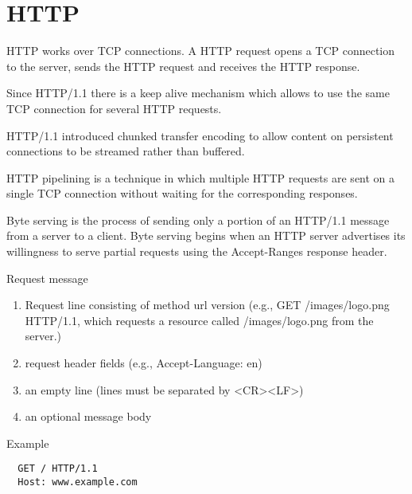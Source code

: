 \section{HTTP}

HTTP works over TCP connections. A HTTP request opens a TCP connection to the
server, sends the HTTP request and receives the HTTP response.

Since HTTP/1.1 there is a keep alive mechanism which allows to use the same
TCP connection for several HTTP requests.

HTTP/1.1 introduced chunked transfer encoding to allow content on persistent
connections to be streamed rather than buffered.

HTTP pipelining is a technique in which multiple HTTP requests are sent on a
single TCP connection without waiting for the corresponding responses.

Byte serving is the process of sending only a portion of an HTTP/1.1 message
from a server to a client. Byte serving begins when an HTTP server advertises
its willingness to serve partial requests using the Accept-Ranges response
header.

\noindent Request message
\begin{enumerate}
\item Request line consisting of method url version (e.g., GET
  /images/logo.png HTTP/1.1, which requests a resource called /images/logo.png
  from the server.)

\item request header fields (e.g., Accept-Language: en)

\item an empty line (lines must be separated by <CR><LF>)

\item an optional message body
\end{enumerate}
%
Example
{\small
\begin{verbatim}
  GET / HTTP/1.1
  Host: www.example.com
\end{verbatim}
}


